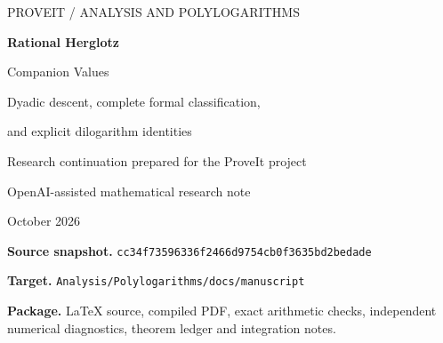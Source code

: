 \documentclass[11pt]{article}
\numberwithin{equation}{section}
\theoremstyle{definition}
\theoremstyle{remark}
\newcommand{\dd}{\,\mathrm d}
\newcommand{\snapshot}{\texttt{cc34f73596336f2466d9754cb0f3635bd2bedade}}
\begin{document}
\begin{titlepage}
\thispagestyle{empty}
\vspace*{0.45in}
{\sffamily\small PROVEIT \quad / \quad ANALYSIS AND POLYLOGARITHMS\par}
\vspace{0.55in}
{\LARGE\bfseries Rational Herglotz\par Companion Values\par}
\vspace{0.23in}
{\Large Dyadic descent, complete formal classification,\par and explicit dilogarithm identities\par}
\vspace{0.45in}
{\large Research continuation prepared for the ProveIt project\par}
\vspace{0.10in}
{\normalsize OpenAI-assisted mathematical research note\par October 2026\par}
\vspace{0.5in}
\begin{abstract}
\noindent
For the Herglotz companion
$J(x)=\int_0^1\log(1+t^x)/(1+t)\dd t$, we resolve the manuscript's
all-rational \emph{formal} reduction problem. At a reduced mixed-parity
ratio, with even entry $e$ and odd entry $o$, reduction to logarithms is
equivalent to $e^2\equiv\pm1\pmod o$ and $o^2\equiv1\pmod{2e}$.
Allowing rational dilogarithms adds precisely six rational arguments:
$1/3,3,1/5,5,3/5,5/3$. The proof combines a conductor-doubling identity
with rigidity of the new dyadic character layer. It uses the existing
all-conductor symbol theorem, whose proof is recalled.

We give a complete even-coefficient quadratic-recurrence parametrization
of the logarithmic cases and an all-finite-order height-counting expansion.
Analytically, a Hecke relation and the Rogers five-term identity yield an
explicit log-sine formula for every $J(n/(n+1))$, and a compact evaluation
of $J(3/5)$. A prime-seven exterior-logarithm witness disproves a
finite-field three-term assertion in the reviewed Radchenko--Zagier
preprint, without affecting the direct boundary formula used here.
Exact finite tests and independent high-precision integral comparisons
accompany the proofs. Formal non-reducibility is not numerical
transcendence; no period-injectivity or proof-assistant claim is made.
\end{abstract}
\vfill
\noindent\small
\textbf{Source snapshot.} \snapshot\par
\noindent\small
\textbf{Target.} \nolinkurl{Analysis/Polylogarithms/docs/manuscript}\par
\noindent\small
\textbf{Package.} LaTeX source, compiled PDF, exact arithmetic checks,
independent numerical diagnostics, theorem ledger and integration notes.
\end{titlepage}
\tableofcontents
\clearpage
\end{document}
